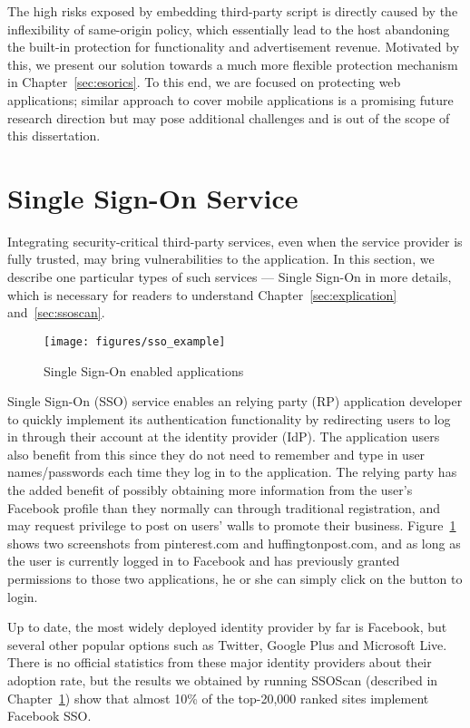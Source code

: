 The high risks exposed by embedding third-party script is directly caused by the inflexibility of same-origin policy, which essentially lead to the host abandoning the built-in protection for functionality and advertisement revenue.  Motivated by this, we present our solution towards a much more flexible protection mechanism in Chapter~\ref{sec:esorics}.  To this end, we are focused on protecting web applications; similar approach to cover mobile applications is a promising future research direction but may pose additional challenges and is out of the scope of this dissertation.

\section{Single Sign-On Service}

Integrating security-critical third-party services, even when the service provider is fully trusted, may bring vulnerabilities to the application.  In this section, we describe one particular types of such services --- Single Sign-On in more details, which is necessary for readers to understand Chapter~\ref{sec:explication} and~\ref{sec:ssoscan}.

\begin{figure}[bth]
\centering
\texttt{[image: figures/sso\_example]}
\caption{Single Sign-On enabled applications}
\label{fig:sso_example}
\end{figure}

Single Sign-On (SSO) service enables an relying party (RP) application developer to quickly implement its authentication functionality by redirecting users to log in through their account at the identity provider (IdP).  The application users also benefit from this since they do not need to remember and type in user names/passwords each time they log in to the application.  The relying party has the added benefit of possibly obtaining more information from the user's Facebook profile than they normally can through traditional registration, and may request privilege to post on users' walls to promote their business.  Figure~\ref{fig:sso_example} shows two screenshots from pinterest.com and huffingtonpost.com, and as long as the user is currently logged in to Facebook and has previously granted permissions to those two applications, he or she can simply click on the button to login.  

Up to date, the most widely deployed identity provider by far is Facebook, but several other popular options such as Twitter, Google Plus and Microsoft Live.  There is no official statistics from these major identity providers about their adoption rate, but the results we obtained by running SSOScan (described in Chapter~\ref{}) show that almost 10\% of the top-20,000 ranked sites implement Facebook SSO.

